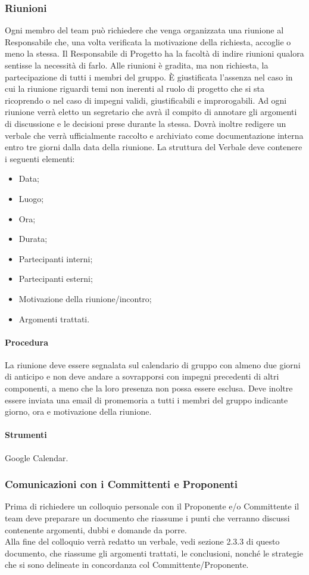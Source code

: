 \subsubsection{Riunioni}
Ogni membro del team può richiedere che venga organizzata una riunione al Responsabile che, una volta verificata la motivazione della richiesta, accoglie o meno la stessa.
Il Responsabile di Progetto ha la facoltà di indire riunioni qualora sentisse la necessità di farlo.
Alle riunioni è gradita, ma non richiesta, la partecipazione di tutti i membri del gruppo. È giustificata l'assenza nel caso in cui la riunione riguardi temi non inerenti al ruolo di progetto che si sta ricoprendo o nel caso di impegni validi, giustificabili e improrogabili.
Ad ogni riunione verrà eletto un segretario che avrà il compito di annotare gli argomenti di discussione e le decisioni prese durante la stessa.
Dovrà inoltre redigere un verbale che verrà ufficialmente raccolto e archiviato come documentazione interna entro tre giorni dalla data della riunione.
La struttura del Verbale deve contenere i seguenti elementi:
\begin{itemize}
\item Data;
\item Luogo;
\item Ora;
\item Durata;
\item Partecipanti interni;
\item Partecipanti esterni;
\item Motivazione della riunione/incontro;
\item Argomenti trattati.
\end{itemize}
\paragraph{Procedura}
La riunione deve essere segnalata sul calendario di gruppo con almeno due giorni di anticipo e non deve andare a sovrapporsi con impegni precedenti di altri componenti, a meno che la loro presenza non possa essere esclusa. Deve inoltre essere inviata una email di promemoria a tutti i membri del gruppo indicante giorno, ora e motivazione della riunione.
\paragraph{Strumenti}
Google Calendar.

\subsubsection{Comunicazioni con i Committenti e Proponenti}
Prima di richiedere un colloquio personale con il Proponente e/o Committente il team deve preparare un documento che riassume i punti che verranno discussi contenente argomenti, dubbi e domande da porre.\\
Alla fine del colloquio verrà redatto un verbale, vedi sezione 2.3.3 di questo documento, che riassume gli argomenti trattati, le conclusioni, nonché le strategie che si sono delineate in concordanza col Committente/Proponente.

